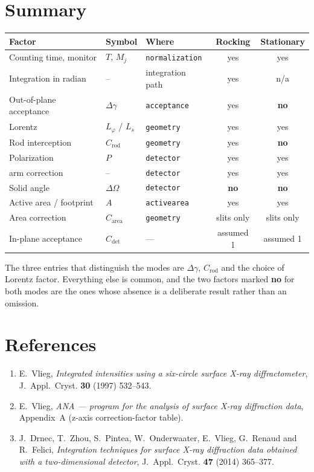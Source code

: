 \documentclass[11pt,a4paper]{article}
\newcommand{\dgam}{\Delta\gamma}
\newcommand{\dOm}{\Delta\Omega}
\newcommand{\Crod}{C_{\mathrm{rod}}}
\newcommand{\Cdet}{C_{\mathrm{det}}}
\newcommand{\Carea}{C_{\mathrm{area}}}
\newcommand{\code}[1]{\texttt{\small #1}}
\begin{document}
\section{Summary}

\begin{center}
\renewcommand{\arraystretch}{1.18}
\begin{tabular}{@{}lllcc@{}}
\toprule
Factor & Symbol & Where & Rocking & Stationary \\
\midrule
Counting time, monitor      & $T$, $M_j$   & \code{normalization} & yes & yes \\
Integration in radian       & --           & integration path     & yes & n/a \\
Out-of-plane acceptance     & $\dgam$      & \code{acceptance}    & yes & \textbf{no} \\
Lorentz                     & $L_\varphi$ / $L_s$ & \code{geometry} & yes & yes \\
Rod interception            & $\Crod$      & \code{geometry}      & yes & \textbf{no} \\
Polarization                & $P$          & \code{detector}      & yes & yes \\
\quad arm correction        & --           & \code{detector}      & yes & yes \\
Solid angle                 & $\dOm$       & \code{detector}      & \textbf{no} & \textbf{no} \\
Active area / footprint     & $A$          & \code{activearea}    & yes & yes \\
Area correction             & $\Carea$     & \code{geometry}      & slits only & slits only \\
In-plane acceptance         & $\Cdet$      & ---                  & assumed 1 & assumed 1 \\
\bottomrule
\end{tabular}
\end{center}

\noindent
The three entries that distinguish the modes are $\dgam$, $\Crod$ and the
choice of Lorentz factor. Everything else is common, and the two factors
marked \textbf{no} for both modes are the ones whose absence is a deliberate
result rather than an omission.

\section*{References}

\begin{enumerate}[leftmargin=1.6em]
\item E.~Vlieg, \emph{Integrated intensities using a six-circle surface X-ray
  diffractometer}, J.~Appl.~Cryst. \textbf{30} (1997) 532--543.
\item E.~Vlieg, \emph{ANA --- program for the analysis of surface X-ray
  diffraction data}, Appendix~A (z-axis correction-factor table).
\item J.~Drnec, T.~Zhou, S.~Pintea, W.~Onderwaater, E.~Vlieg, G.~Renaud and
  R.~Felici, \emph{Integration techniques for surface X-ray diffraction data
  obtained with a two-dimensional detector}, J.~Appl.~Cryst. \textbf{47}
  (2014) 365--377.
\end{enumerate}
\end{document}
